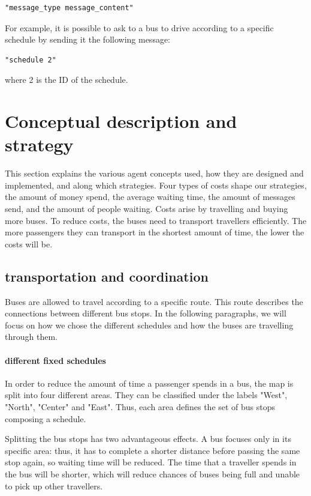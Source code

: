 \documentclass{article}
\begin{document}
\begin{verbatim}
"message_type message_content"
\end{verbatim}

For example, it is possible to ask to a bus to drive according to a specific schedule by sending it the following message:

\begin{verbatim}
"schedule 2"
\end{verbatim}

where 2 is the ID of the schedule.

\section{Conceptual description and strategy}
This section explains the various agent concepts used, how they are designed and implemented, and along which strategies. Four types of costs shape our strategies, the amount of money spend, the average waiting time, the amount of messages send, and the amount of people waiting. Costs arise by travelling and buying more buses. To reduce costs, the buses need to transport travellers efficiently. The more passengers they can transport in the shortest amount of time, the lower the costs will be.

\subsection{transportation and coordination}
Buses are allowed to travel according to a specific route. This route describes the connections between different bus stops. In the following paragraphs, we will focus on how we chose the different schedules and how the buses are travelling through them.
 
\paragraph{different fixed schedules}
In order to reduce the amount of time a passenger spends in a bus, the map is split into four different areas. They can be classified under the labels "West", "North", "Center" and "East". Thus, each area defines the set of bus stops composing a schedule.

Splitting the bus stops has two advantageous effects. A bus focuses only in its specific area: thus, it has to complete a shorter distance before passing the same stop again, so waiting time will be reduced. The time that a traveller spends in the bus will be shorter, which will reduce chances of buses being full and unable to pick up other travellers.
\end{document}
